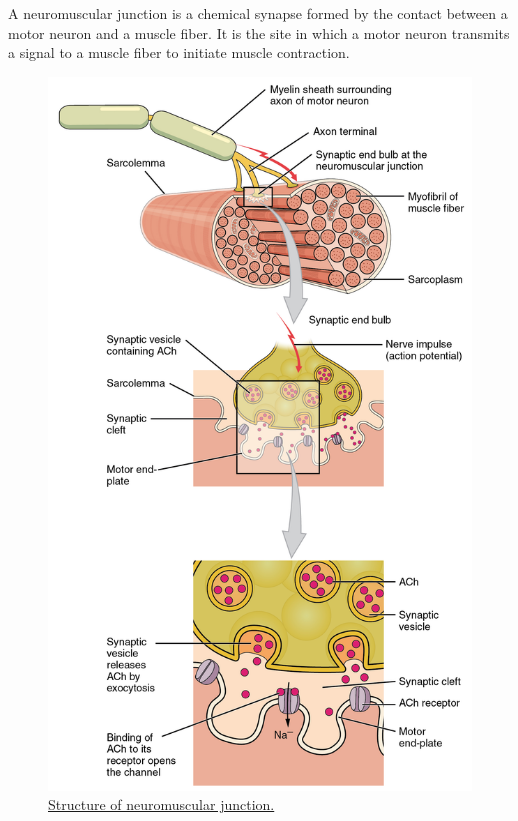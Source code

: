 A neuromuscular junction is a chemical synapse formed by the contact between a motor neuron and a muscle fiber. It is the site in which a motor neuron transmits a signal to a muscle fiber to initiate muscle contraction.



\begin{figure}

{\centering \includegraphics[width=0.7\linewidth]{./figures/locomotion/1009_Motor_End_Plate_and_Innervation} 

}

\caption{\href{https://upload.wikimedia.org/wikipedia/commons/5/57/1009_Motor_End_Plate_and_Innervation.jpg}{Structure of neuromuscular junction.}}\label{fig:neuromuscularjunction}
\end{figure}

